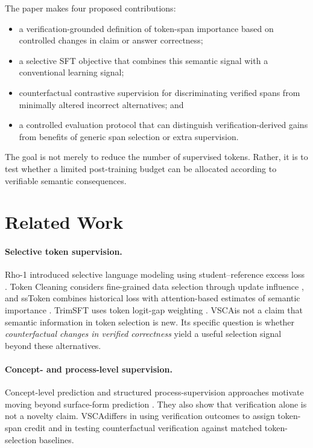 \documentclass{article}
\newcommand{\vsca}{\textsc{VSCA}}
\begin{document}
The paper makes four proposed contributions:
\begin{itemize}
  \item a verification-grounded definition of token-span importance based on controlled changes in claim or answer correctness;
  \item a selective SFT objective that combines this semantic signal with a conventional learning signal;
  \item counterfactual contrastive supervision for discriminating verified spans from minimally altered incorrect alternatives; and
  \item a controlled evaluation protocol that can distinguish verification-derived gains from benefits of generic span selection or extra supervision.
\end{itemize}
The goal is not merely to reduce the number of supervised tokens. Rather, it is to test whether a limited post-training budget can be allocated according to verifiable semantic consequences.

\section{Related Work}
\label{sec:related}
\paragraph{Selective token supervision.} Rho-1 introduced selective language modeling using student--reference excess loss \citep{rho1}. Token Cleaning considers fine-grained data selection through update influence \citep{tokenCleaning}, and ssToken combines historical loss with attention-based estimates of semantic importance \citep{ssToken}. TrimSFT uses token logit-gap weighting \citep{trimSFT}. \vsca is not a claim that semantic information in token selection is new. Its specific question is whether \emph{counterfactual changes in verified correctness} yield a useful selection signal beyond these alternatives.

\paragraph{Concept- and process-level supervision.} Concept-level prediction and structured process-supervision approaches motivate moving beyond surface-form prediction \citep{beyondTokens,verifiableProcess}. They also show that verification alone is not a novelty claim. \vsca differs in using verification outcomes to assign token-span credit and in testing counterfactual verification against matched token-selection baselines.
\end{document}
